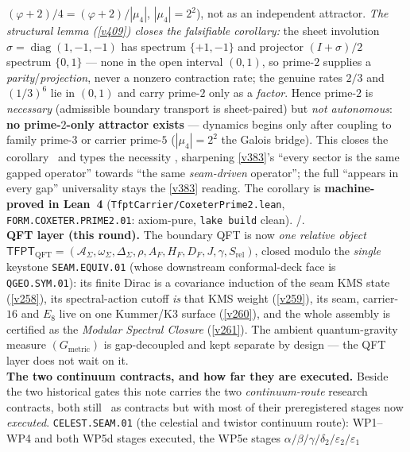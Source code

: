 \documentclass[11pt,a4paper]{article}
\begin{document}
\begin{keybox}
$(\varphi{+}2)/4=(\varphi{+}2)/|\mu_4|$, $|\mu_4|{=}2^2$), not as an independent attractor. \emph{The structural
lemma (\vref{v409}) closes the falsifiable corollary:} the sheet involution $\sigma{=}\operatorname{diag}(1,-1,-1)$
has spectrum $\{+1,-1\}$ and projector $(I{+}\sigma)/2$ spectrum $\{0,1\}$ --- none in the open interval $(0,1)$,
so prime-$2$ supplies a \emph{parity}/\emph{projection}, never a nonzero contraction rate; the genuine rates $2/3$
and $(1/3)^6$ lie in $(0,1)$ and carry prime-$2$ only as a \emph{factor}. Hence prime-$2$ is \emph{necessary}
(admissible boundary transport is sheet-paired) but \emph{not autonomous}: \textbf{no prime-$2$-only attractor
exists} --- dynamics begins only after coupling to family prime-$3$ or carrier prime-$5$ ($|\mu_4|{=}2^2$ the
Galois bridge). This closes the corollary \mE\ and types the necessity \mC, sharpening \vref{v383}'s ``every
sector is the same gapped operator'' towards ``the same \emph{seam-driven} operator''; the full ``appears in
every gap'' universality stays the \vref{v383} reading. The corollary is \textbf{machine-proved in Lean~4}
(\texttt{TfptCarrier/CoxeterPrime2.lean}, \texttt{FORM.COXETER.PRIME2.01}: axiom-pure, \texttt{lake build}
clean). \mE/\mC.
\smallskip\\
\noindent\textbf{QFT layer (this round).} The boundary QFT is now \emph{one relative object}
$\mathsf{TFPT}_{\mathrm{QFT}}=(\mathcal A_\Sigma,\omega_\Sigma,\Delta_\Sigma,\rho,A_F,H_F,D_F,J,\gamma,
S_{\mathrm{rel}})$, closed modulo the \emph{single} keystone \texttt{SEAM.EQUIV.01} (whose downstream
conformal-deck face is \texttt{QGEO.SYM.01}): its finite Dirac is a
covariance induction of the seam KMS state (\vref{v258}), its spectral-action cutoff \emph{is} that KMS
weight (\vref{v259}), its seam, carrier-$16$ and $E_8$ live on one Kummer/K3 surface (\vref{v260}), and the
whole assembly is certified as the \emph{Modular Spectral Closure} (\vref{v261}). The ambient
quantum-gravity measure $(G_{\mathrm{metric}})$ is gap-decoupled and kept separate by design --- the QFT
layer does not wait on it.
\smallskip\\
\noindent\textbf{The two continuum contracts, and how far they are executed.} Beside the two
historical gates this note carries the two \emph{continuum-route} research contracts, both still
\mO\ as contracts but with most of their preregistered stages now \emph{executed}.
\texttt{CELEST.SEAM.01} (the celestial and twistor continuum route): WP1--WP4 and both WP5d
stages executed, the WP5e stages $\alpha/\beta/\gamma/\delta_2/\varepsilon_2/\varepsilon_1$

\end{keybox}
\end{document}
